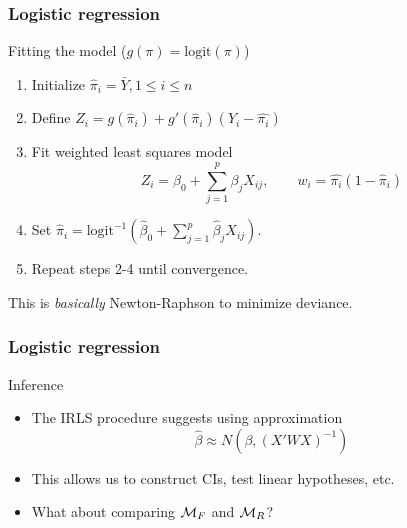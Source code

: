 \documentclass[handout]{beamer}
\begin{document}
   \begin{frame} \frametitle{Logistic regression}

   \begin{block}
         {Fitting the model ($g(\pi) = \text{logit}(\pi)$)}
         \begin{enumerate}
         \item Initialize $\widehat{\pi}_i = \bar{Y}, 1 \leq i \leq n$

         \item Define $Z_i = g(\widehat{\pi}_i) + g'(\widehat{\pi}_i) (Y_i - \widehat{\pi_i})$

         \item Fit weighted least squares model
   $$
   Z_i = \beta_0 + \sum_{j=1}^p \beta_j X_{ij}, \qquad w_i = \widehat{\pi_i} (1 - \widehat{\pi}_i)$$

   \item Set $\widehat{\pi}_i = \text{logit}^{-1} \left(\widehat{\beta}_0 + \sum_{j=1}^p \widehat{\beta}_j X_{ij}\right)$.

   \item Repeat steps 2-4 until convergence.
         \end{enumerate}
    This is {\em basically} Newton-Raphson to minimize deviance.
   \end{block}
   \end{frame}


   \begin{frame} \frametitle{Logistic regression}

   \begin{block}
         {Inference}
         \begin{itemize}
         \item The IRLS procedure suggests using approximation
   $$
   \widehat{\beta} \approx N(\beta, (X'WX)^{-1})
   $$

   \item This allows us to construct CIs, test linear hypotheses, etc.

   \item What about comparing ${\cal M}_F$ and ${\cal M}_R$?
         \end{itemize}
   \end{block}
   \end{frame}

\end{document}
